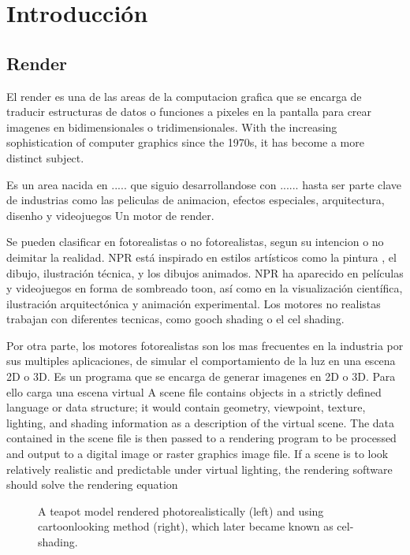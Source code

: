 \chapter{Introducci\'on}

\section{Render}
El render es una de las areas de la computacion grafica que se encarga de
traducir estructuras de datos o funciones a pixeles en la pantalla para crear imagenes
en bidimensionales o tridimensionales.
With the increasing sophistication of computer graphics since the 1970s, it has become
a more distinct subject.

Es un area nacida en ..... que siguio desarrollandose con ...... hasta ser parte clave
de industrias como las peliculas de animacion, efectos especiales, arquitectura, disenho
y videojuegos Un motor de render. 

Se pueden clasificar en fotorealistas o no fotorealistas, segun su intencion o no deimitar la realidad. 
NPR está inspirado en estilos artísticos como la pintura , el dibujo, ilustración técnica, y los dibujos animados.
NPR ha aparecido en películas y videojuegos en forma de sombreado toon, así como en la visualización científica,
ilustración arquitectónica y animación experimental. Los motores no realistas trabajan con diferentes tecnicas,
como gooch shading o el cel shading.

Por otra parte, los motores fotorealistas son los mas frecuentes en la industria por sus multiples aplicaciones, de simular el comportamiento de la luz en una escena 2D o 3D. 
Es un programa que se encarga de generar imagenes en 2D o 3D. Para ello carga una escena virtual
A scene file contains objects in a strictly defined language or data structure; it would contain geometry, viewpoint, texture, lighting, and shading information as a description of the virtual scene.
The data contained in the scene file is then passed to a rendering program to be processed and output to a digital image or raster graphics image file. 
If a scene is to look relatively realistic and predictable under virtual lighting, the rendering software should solve the rendering equation

\singlespacing

\begin{figure}[H]
\setlength{\fboxsep}{0pt}
\caption{
    A teapot model rendered photorealistically (left) and using cartoonlooking method (right), which later
    became known as cel-shading.\autocite{decaudinnpr}
}
\singlespacing
\end{figure}

